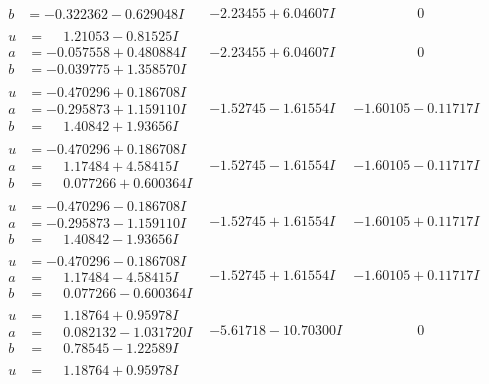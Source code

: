\documentclass[1p]{elsarticle_modified}
\theoremstyle{definition}
\begin{document}
$$\begin{array}{c|c|c}
\begin{aligned}
b &= -0.322362 - 0.629048 I\end{aligned}
 & -2.23455 + 6.04607 I & \phantom{-0.000000 } 0 \\ \hline\begin{aligned}
u &= \phantom{-}1.21053 - 0.81525 I \\
a &= -0.057558 + 0.480884 I \\
b &= -0.039775 + 1.358570 I\end{aligned}
 & -2.23455 + 6.04607 I & \phantom{-0.000000 } 0 \\ \hline\begin{aligned}
u &= -0.470296 + 0.186708 I \\
a &= -0.295873 + 1.159110 I \\
b &= \phantom{-}1.40842 + 1.93656 I\end{aligned}
 & -1.52745 - 1.61554 I & -1.60105 - 0.11717 I \\ \hline\begin{aligned}
u &= -0.470296 + 0.186708 I \\
a &= \phantom{-}1.17484 + 4.58415 I \\
b &= \phantom{-}0.077266 + 0.600364 I\end{aligned}
 & -1.52745 - 1.61554 I & -1.60105 - 0.11717 I \\ \hline\begin{aligned}
u &= -0.470296 - 0.186708 I \\
a &= -0.295873 - 1.159110 I \\
b &= \phantom{-}1.40842 - 1.93656 I\end{aligned}
 & -1.52745 + 1.61554 I & -1.60105 + 0.11717 I \\ \hline\begin{aligned}
u &= -0.470296 - 0.186708 I \\
a &= \phantom{-}1.17484 - 4.58415 I \\
b &= \phantom{-}0.077266 - 0.600364 I\end{aligned}
 & -1.52745 + 1.61554 I & -1.60105 + 0.11717 I \\ \hline\begin{aligned}
u &= \phantom{-}1.18764 + 0.95978 I \\
a &= \phantom{-}0.082132 - 1.031720 I \\
b &= \phantom{-}0.78545 - 1.22589 I\end{aligned}
 & -5.61718 - 10.70300 I & \phantom{-0.000000 } 0 \\ \hline\begin{aligned}
u &= \phantom{-}1.18764 + 0.95978 I \\

\end{aligned}
\end{array}$$
\end{document}
